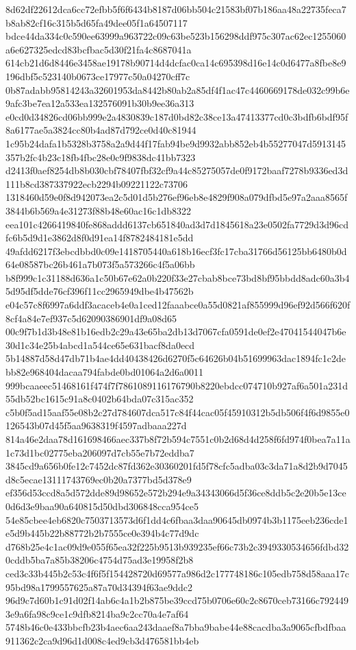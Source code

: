 \documentclass[11pt,a4paper]{article}
\begin{document}
{8d62df22612dca6cc72efbb5f6f6434b8187d06bb504c21583bf07b186aa48a22735feca7b8ab82cf16c315b5d65fa49dee05f1a64507117
bdce44da334c0c590ee63999a963722c09c63be523b156298ddf975c307ac62ec1255060a6e627325edcd83bcfbac5d30f21fa4c8687041a
614cb21d6d8446e3458ae19178b90714d4dcfac0ca14c695398d16e14c0d6477a8fbe8e9196dbf5c523140b0673ce17977c50a04270cff7c
0b87adabb95814243a32601953da8442b80ab2a85df4f1ac47c4460669178de032c99b6e9afc3be7ea12a533ea132576091b30b9ee36a313
e0cd0d34826cd06bb999e2a4830839c187d0bd82c38ce13a47413377cd0c3bdfb6bdf95f8a6177ae5a3824cc80b4ad87d792ce0d40c81944
1c95b24dafa1b5328b3758a2a9d44f17fab94be9d9932abb852eb4b55277047d5913145357b2fc4b23c18fb4fbc28e0c9f9838dc41bb7323
d2413f0aef8254db8b030cbf78407fbf32cf9a44c85275057de0f9172baaf7278b9336ed3d111b8cd387337922ecb2294b09221122c73706
1318460d59e0f8d942073ea2c5d01d5b276ef96eb8e4829f908a079dfbd5e97a2aaa8565f3844b6b569a4e31273f88b48e60ac16c1db8322
eea101c4266419840fe868addd6137cb651840ad3d7d1845618a23e0502fa7729d3d96cdfc6b5d9d1e3862d8f0d91ea14f8782484181e5dd
49afdd6217f3ebcdbbd0c09e1418705440a618b16ecf3fc17cba31766d56125bb6480b0d64e08587bc26b461a7b073f5a573266c4f5a06bb
b8f999c1c31188d636a1c50b67e62a0b220f33e27cbab8bce73bd8bf95bbdd8adc60a3b45d95df5dde76cf396f11cc2965949dbe4b47562b
e04c57c8f6997a6ddf3acaceb4e0a1ced12faaabce0a55d0821af855999d96ef92d566f620f8cf4a84e7ef937c5d62090386901df9a08d65
00c9f7b1d3b48e81b16edb2c29a43e65ba2db13d7067cfa0591de0ef2e47041544047b6e30d1c34e25b4abcd1a544ce65e631bacf8da0ecd
5b14887d58d47db71b4ae4dd40438426d6270f5c64626b04b51699963dac1894fc1c2debb82e968404dacaa794fabde0bd01064a2d6a0011
999bcaaeec51468161f474f7f7861089116176790b8220ebdcc074710b927af6a501a231d55db52bc1615c91a8c0402b64bda07c315ac352
c5b0f5ad15aaf55e08b2c27d784607dca517c84f44cac05f45910312b5db506f4f6d9855e0126543b07d45f5aa9638319f4597adbaaa227d
814a46e2daa78d161698466aec337b8f72b594c7551c0b2d68d4d258f6fd974f0bea7a11a1c73d1bc02775eba206097d7cb55e7b72eddba7
3845cd9a656b0fe12c7452dc87fd362e30360201fd5f78cfc5adba03c3da71a8d2b9d7045d8c5ecae13111743769ec0b20a7377bd5d378e9
ef356d53ccd8a5d572dde89d98652e572b294e9a34343066d5f36ce8ddb5c2e20b5e13ce0d6d3e9baa90a640815d50dbd306848cca954ce5
54e85cbee4eb6820c7503713573d6f1dd4c6fbaa3daa90645db0974b3b1175eeb236cde1e5d9b445b22b88772b2b7555ce0e394b4c77d9dc
d768b25e4c1ac09d9e055f65ea32f225b9513b939235ef66c73b2c3949330534656fdbd320cddb5ba7a85b38206c4754d75ad3e19958f2b8
ced3c33b445b2c53c4f6f5f154428720d69577a986d2c177748186c105edb758d58aaa17c95bd98a1799557625a87a70d34394f63ae9ddc2
96d9c7d60b1c91d02f14ab6c4a1b2b875be39ccd75b0706e60c2c8670ceb73166c7924493e9a6fa98c9ce1c9dfb8214ba9c2cc70a4e7af64
5748b46c0e433bbcfb23b4aec6aa243daaef8a7bba9babe44e88cacdba3a9065cfbdfbaa911362c2ca9d96d1d008c4ed9cb3d476581bb4eb
}
\end{document}
